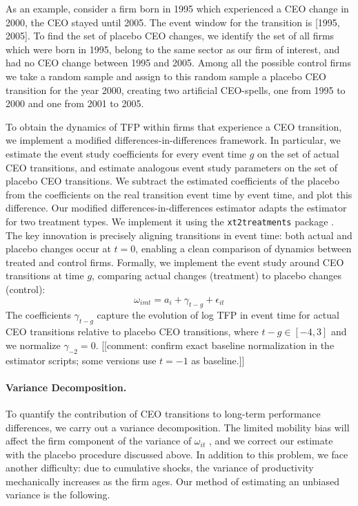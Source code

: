 \documentclass[11pt,a4paper]{article}
\begin{document}
As an example, consider a firm born in 1995 which experienced a CEO change in 2000, the CEO stayed until 2005. The event window for the transition is [1995, 2005]. To find the set of placebo CEO changes, we identify the set of all firms which were born in 1995, belong to the same sector as our firm of interest, and had no CEO change between 1995 and 2005. Among all the possible control firms we take a random sample and assign to this random sample a placebo CEO transition for the year 2000, creating two artificial CEO-spells, one from 1995 to 2000 and one from 2001 to 2005.

To obtain the dynamics of TFP within firms that experience a CEO transition, we implement a modified differences-in-differences framework. In particular, we estimate the event study coefficients for every event time $g$ on the set of actual CEO transitions, and estimate analogous event study parameters on the set of placebo CEO transitions. We subtract the estimated coefficients of the placebo from the coefficients on the real transition event time by event time, and plot this difference. Our modified differences-in-differences estimator adapts the \citet{Callaway2021JoLE} estimator for two treatment types. We implement it using the \texttt{xt2treatments} package \citep{Koren2024xt2treatments}. The key innovation is precisely aligning transitions in event time: both actual and placebo changes occur at $t=0$, enabling a clean comparison of dynamics between treated and control firms. 
Formally, we implement the event study around CEO transitions at time $g$, comparing actual changes (treatment) to placebo changes (control):
\begin{equation}
\omega_{imt} = a_i + \gamma_{t-g} + \epsilon_{it}
\end{equation}
The coefficients $\gamma_{t-g}$ capture the evolution of log TFP in event time for actual CEO transitions relative to placebo CEO transitions, where $t-g \in [-4, 3]$ and we normalize $\gamma_{-2} = 0$. [[comment: confirm exact baseline normalization in the estimator scripts; some versions use $t=-1$ as baseline.]]


\paragraph{Variance Decomposition.} To quantify the contribution of CEO transitions to long-term performance differences, we carry out a variance decomposition. The limited mobility bias will affect the firm component of the variance of $\omega_{it}$ \citep{kline2024firm}, and we correct our estimate with the placebo procedure discussed above. In addition to this problem, we face another difficulty: due to cumulative shocks, the variance of productivity mechanically increases as the firm ages. Our method of estimating an unbiased variance is the following.
\end{document}
